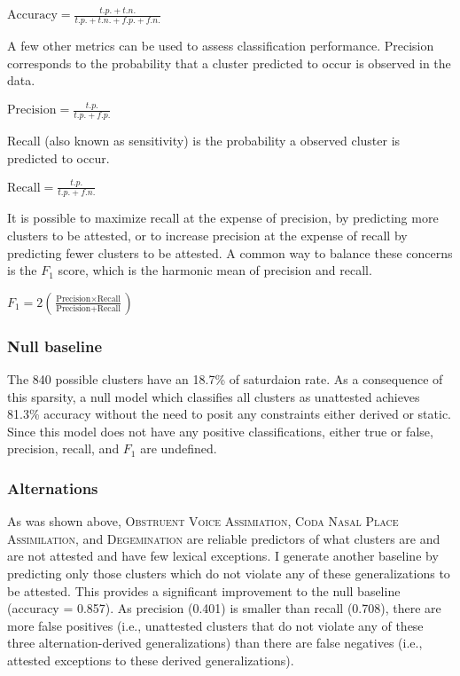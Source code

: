 \begin{example}
$\displaystyle \textrm{Accuracy} = \frac{t.p. + t.n.}{t.p. + t.n. + f.p. + f.n.}$
\end{example}

\noindent
A few other metrics can be used to assess classification performance. Precision corresponds to the probability that a cluster predicted to occur is observed in the data. 
\begin{example}
$\displaystyle \textrm{Precision} = \frac{t.p.}{t.p. + f.p.}$ 
\end{example}

\noindent
Recall (also known as sensitivity) is the probability a observed cluster is predicted to occur. 

\begin{example}
$\displaystyle \textrm{Recall} = \frac{t.p.}{t.p. + f.n.}$
\end{example}

It is possible to maximize recall at the expense of precision, by predicting more clusters to be attested, or to increase precision at the expense of recall by predicting fewer clusters to be attested. A common way to balance these concerns is the $F_1$ score, which is the harmonic mean of precision and recall.

\begin{example}
$\displaystyle F_1 = 2 \left( \frac{\textrm{Precision} \times \textrm{Recall}}{\textrm{Precision} + \textrm{Recall}}\right)$ 
\end{example}

\subsubsection{Null baseline}

The 840 possible clusters have an 18.7\% of saturdaion rate. As a consequence of this sparsity, a null model which classifies all clusters as unattested achieves 81.3\% accuracy without the need to posit any constraints either derived or static. Since this model does not have any positive classifications, either true or false, precision, recall, and $F_1$ are undefined.

\subsubsection{Alternations}

As was shown above, \textsc{Obstruent Voice Assimiation}, \textsc{Coda Nasal Place Assimilation}, and \textsc{Degemination} are reliable predictors of what clusters are and are not attested and have few lexical exceptions. I generate another baseline by predicting only those clusters which do not violate any of these generalizations to be attested. This provides a significant improvement to the null baseline (accuracy = 0.857). As precision (0.401) is smaller than recall (0.708), there are more false positives (i.e., unattested clusters that do not violate any of these three alternation-derived generalizations) than there are false negatives (i.e., attested exceptions to these derived generalizations). 

